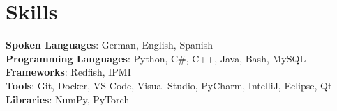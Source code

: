 \documentclass[letterpaper,11pt]{article}
\begin{document}
%
\section{Skills}
 \begin{itemize}[leftmargin=0.15in, label={}]
    \small{\item{
     \textbf{Spoken Languages}{: German, English, Spanish } \\
     \textbf{Programming Languages}{: Python, C\#, C++, Java, Bash, MySQL } \\
     \textbf{Frameworks}{: Redfish, IPMI} \\
     \textbf{Tools}{: Git, Docker, VS Code, Visual Studio, PyCharm, IntelliJ, Eclipse, Qt} \\
     \textbf{Libraries}{: NumPy, PyTorch}
    }}
 \end{itemize}


\end{document}
